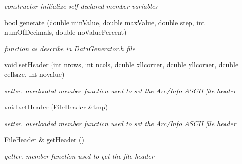\begin{DoxyCompactItemize}
\begin{DoxyCompactList}\small\item\em constructor initialize self-\/declared member variables \end{DoxyCompactList}\item 
\hypertarget{classArcInfoASCIIGenerator_a985454ab0740ddc4fd0fcb6bec7b6c05}{bool \hyperlink{classArcInfoASCIIGenerator_a985454ab0740ddc4fd0fcb6bec7b6c05}{generate} (double min\-Value, double max\-Value, double step, int num\-Of\-Decimals, double no\-Value\-Percent)}\label{classArcInfoASCIIGenerator_a985454ab0740ddc4fd0fcb6bec7b6c05}

\begin{DoxyCompactList}\small\item\em function as describe in \hyperlink{DataGenerator_8h}{\-Data\-Generator.\-h} file \end{DoxyCompactList}\item 
\hypertarget{classArcInfoASCIIGenerator_a658168a9ebabc01febd8f1feced60041}{void \hyperlink{classArcInfoASCIIGenerator_a658168a9ebabc01febd8f1feced60041}{set\-Header} (int nrows, int ncols, double xllcorner, double yllcorner, double cellsize, int novalue)}\label{classArcInfoASCIIGenerator_a658168a9ebabc01febd8f1feced60041}

\begin{DoxyCompactList}\small\item\em setter. overloaded member function used to set the \-Arc/\-Info \-A\-S\-C\-I\-I file header \end{DoxyCompactList}\item 
\hypertarget{classArcInfoASCIIGenerator_af26ec3aa74fb8ef2c6b9b023b9138d71}{void \hyperlink{classArcInfoASCIIGenerator_af26ec3aa74fb8ef2c6b9b023b9138d71}{set\-Header} (\hyperlink{structArcInfoASCIIGenerator_1_1FileHeader}{\-File\-Header} \&tmp)}\label{classArcInfoASCIIGenerator_af26ec3aa74fb8ef2c6b9b023b9138d71}

\begin{DoxyCompactList}\small\item\em setter. overloaded member function used to set the \-Arc/\-Info \-A\-S\-C\-I\-I file header \end{DoxyCompactList}\item 
\hypertarget{classArcInfoASCIIGenerator_a2e5512db74f473c929fe0a06de92902d}{\hyperlink{structArcInfoASCIIGenerator_1_1FileHeader}{\-File\-Header} \& \hyperlink{classArcInfoASCIIGenerator_a2e5512db74f473c929fe0a06de92902d}{get\-Header} ()}\label{classArcInfoASCIIGenerator_a2e5512db74f473c929fe0a06de92902d}

\begin{DoxyCompactList}\small\item\em getter. member function used to get the file header \end{DoxyCompactList}\end{DoxyCompactItemize}


